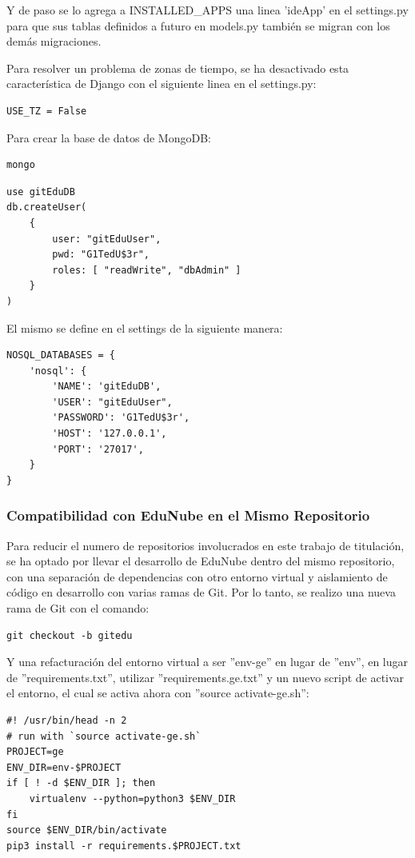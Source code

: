 Y de paso se lo agrega a INSTALLED\_APPS una linea 'ideApp' en el settings.py para que sus tablas definidos a futuro en models.py también se migran con los demás migraciones.

Para resolver un problema de zonas de tiempo, se ha desactivado esta característica de Django con el siguiente linea en el settings.py:
\lstset{language=Python}
\begin{lstlisting}
USE_TZ = False
\end{lstlisting}
\lstset{language=Bash}

Para crear la base de datos de MongoDB:
\begin{lstlisting}
mongo
\end{lstlisting}
\lstset{language=sql}
\begin{lstlisting}
use gitEduDB
db.createUser(
    {
        user: "gitEduUser",
        pwd: "G1TedU$3r",
        roles: [ "readWrite", "dbAdmin" ]
    }
)
\end{lstlisting}
\lstset{language=Bash}

El mismo se define en el settings de la siguiente manera:
\lstset{language=Python}
\begin{lstlisting}
NOSQL_DATABASES = {
    'nosql': {
        'NAME': 'gitEduDB',
        'USER': "gitEduUser",
        'PASSWORD': 'G1TedU$3r',
        'HOST': '127.0.0.1',
        'PORT': '27017',
    }
}
\end{lstlisting}
\lstset{language=Bash}

\subsubsection{Compatibilidad con EduNube en el Mismo Repositorio}
Para reducir el numero de repositorios involucrados en este trabajo de titulación, se ha optado por llevar el desarrollo de EduNube dentro del mismo repositorio, con una separación de dependencias con otro entorno virtual y aislamiento de código en desarrollo con varias ramas de Git. Por lo tanto, se realizo una nueva rama de Git con el comando:
\begin{lstlisting}
git checkout -b gitedu
\end{lstlisting}

Y una refacturación del entorno virtual a ser ''env-ge'' en lugar de ''env'', en lugar de ''requirements.txt'', utilizar ''requirements.ge.txt'' y un nuevo script de activar el entorno, el cual se activa ahora con ''source activate-ge.sh'':
\begin{lstlisting}
#! /usr/bin/head -n 2 
# run with `source activate-ge.sh`
PROJECT=ge
ENV_DIR=env-$PROJECT
if [ ! -d $ENV_DIR ]; then
	virtualenv --python=python3 $ENV_DIR
fi
source $ENV_DIR/bin/activate
pip3 install -r requirements.$PROJECT.txt
\end{lstlisting}

